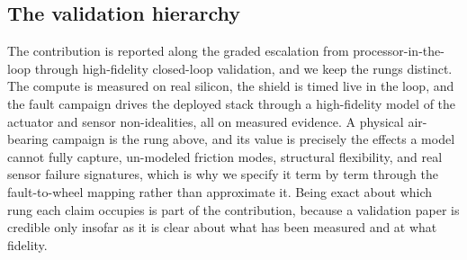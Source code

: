 \documentclass[journal]{IEEEtran}
\begin{document}
\subsection{The validation hierarchy} The contribution is reported along the graded
escalation from processor-in-the-loop through high-fidelity closed-loop validation, and we keep the
rungs distinct. The compute is measured on real silicon, the shield is timed live in the loop, and
the fault campaign drives the deployed stack through a high-fidelity model of the actuator and
sensor non-idealities, all on measured evidence. A physical air-bearing campaign is the rung above,
and its value is precisely the effects a model cannot fully capture, un-modeled friction modes,
structural flexibility, and real sensor failure signatures, which is why we specify it term by term
through the fault-to-wheel mapping rather than approximate it. Being exact about which rung each
claim occupies is part of the contribution, because a validation paper is credible only insofar as
it is clear about what has been measured and at what fidelity.
\end{document}
